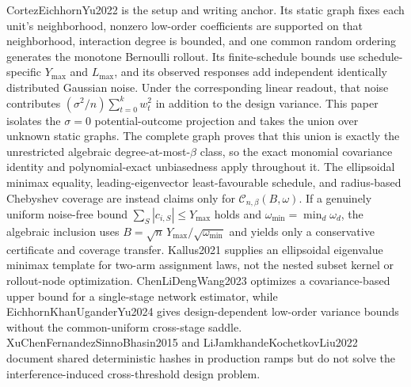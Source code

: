 CortezEichhornYu2022 is the setup and writing anchor.  Its static graph fixes each unit's neighborhood, nonzero low-order coefficients are supported on that neighborhood, interaction degree is bounded, and one common random ordering generates the monotone Bernoulli rollout.  Its finite-schedule bounds use schedule-specific \(Y_{\max}\) and \(L_{\max}\), and its observed responses add independent identically distributed Gaussian noise.  Under the corresponding linear readout, that noise contributes \((\sigma^2/n)\sum_{t=0}^k w_t^2\) in addition to the design variance.  This paper isolates the \(\sigma=0\) potential-outcome projection and takes the union over unknown static graphs.  The complete graph proves that this union is exactly the unrestricted algebraic degree-at-most-\(\beta\) class, so the exact monomial covariance identity and polynomial-exact unbiasedness apply throughout it.  The ellipsoidal minimax equality, leading-eigenvector least-favourable schedule, and radius-based Chebyshev coverage are instead claims only for \(\mathcal C_{n,\beta}(B,\omega)\).  If a genuinely uniform noise-free bound \(\sum_S|c_{i,S}|\le Y_{\max}\) holds and \(\omega_{\min}=\min_d\omega_d\), the algebraic inclusion uses \(B=\sqrt n\,Y_{\max}/\sqrt{\omega_{\min}}\) and yields only a conservative certificate and coverage transfer.  Kallus2021 supplies an ellipsoidal eigenvalue minimax template for two-arm assignment laws, not the nested subset kernel or rollout-node optimization.  ChenLiDengWang2023 optimizes a covariance-based upper bound for a single-stage network estimator, while EichhornKhanUganderYu2024 gives design-dependent low-order variance bounds without the common-uniform cross-stage saddle.  XuChenFernandezSinnoBhasin2015 and LiJamkhandeKochetkovLiu2022 document shared deterministic hashes in production ramps but do not solve the interference-induced cross-threshold design problem.